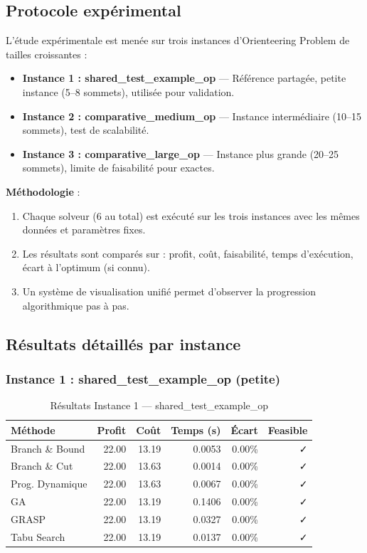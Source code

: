 \documentclass[11pt,a4paper]{article}
\begin{document}
\subsection{Protocole expérimental}

L'étude expérimentale est menée sur trois instances d'Orienteering Problem de tailles croissantes :

\begin{itemize}
    \item \textbf{Instance 1 : shared\_test\_example\_op} — Référence partagée, petite instance (5–8 sommets), utilisée pour validation.
    \item \textbf{Instance 2 : comparative\_medium\_op} — Instance intermédiaire (10–15 sommets), test de scalabilité.
    \item \textbf{Instance 3 : comparative\_large\_op} — Instance plus grande (20–25 sommets), limite de faisabilité pour exactes.
\end{itemize}

\textbf{Méthodologie} :

\begin{enumerate}
    \item Chaque solveur (6 au total) est exécuté sur les trois instances avec les mêmes données et paramètres fixes.
    \item Les résultats sont comparés sur : profit, coût, faisabilité, temps d'exécution, écart à l'optimum (si connu).
    \item Un système de visualisation unifié permet d'observer la progression algorithmique pas à pas.
\end{enumerate}

\subsection{Résultats détaillés par instance}

\subsubsection*{Instance 1 : shared\_test\_example\_op (petite)}

\begin{table}[H]
\centering
\caption{Résultats Instance 1 — shared\_test\_example\_op}
\begin{tabular}{lrrrrr}
\toprule
\textbf{Méthode} & \textbf{Profit} & \textbf{Coût} & \textbf{Temps (s)} & \textbf{Écart} & \textbf{Feasible} \\
\midrule
Branch \& Bound & 22.00 & 13.19 & 0.0053 & 0.00\% & ✓ \\
Branch \& Cut & 22.00 & 13.63 & 0.0014 & 0.00\% & ✓ \\
Prog. Dynamique & 22.00 & 13.63 & 0.0067 & 0.00\% & ✓ \\
GA & 22.00 & 13.19 & 0.1406 & 0.00\% & ✓ \\
GRASP & 22.00 & 13.19 & 0.0327 & 0.00\% & ✓ \\
Tabu Search & 22.00 & 13.19 & 0.0137 & 0.00\% & ✓ \\
\bottomrule
\end{tabular}
\end{table}
\end{document}
